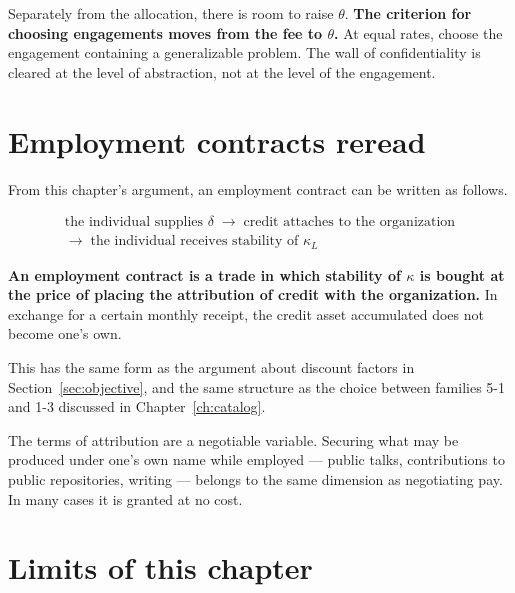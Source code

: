 Separately from the allocation, there is room to raise $\theta$.
\textbf{The criterion for choosing engagements moves from the fee to $\theta$.}
At equal rates, choose the engagement containing a generalizable problem. The wall of
confidentiality is cleared at the level of abstraction, not at the level of the engagement.

\section{Employment contracts reread}

From this chapter's argument, an employment contract can be written as follows.

\begin{equation}
\begin{gathered}
\text{the individual supplies } \delta \;\to\; \text{credit attaches to the organization}\\
\to\; \text{the individual receives stability of } \kappa_L
\end{gathered}
\end{equation}

\textbf{An employment contract is a trade in which stability of $\kappa$ is bought at the
price of placing the attribution of credit with the organization.} In exchange for a certain
monthly receipt, the credit asset accumulated does not become one's own.

This has the same form as the argument about discount factors in
Section~\ref{sec:objective}, and the same structure as the choice between families 5-1 and
1-3 discussed in Chapter~\ref{ch:catalog}.

The terms of attribution are a negotiable variable. Securing what may be produced under one's
own name while employed --- public talks, contributions to public repositories, writing ---
belongs to the same dimension as negotiating pay. In many cases it is granted at no cost.

\section{Limits of this chapter}

